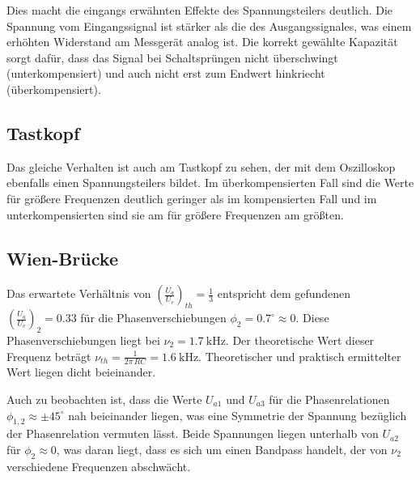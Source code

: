 \documentclass[10pt,a4paper]{scrartcl}
\begin{document}
Dies macht die eingangs erwähnten Effekte des Spannungsteilers deutlich.
Die Spannung vom Eingangssignal ist stärker als die des Ausgangssignales,
was einem erhöhten Widerstand am Messgerät analog ist.
Die korrekt gewählte Kapazität sorgt dafür,
dass das Signal bei Schaltsprüngen nicht überschwingt (unterkompensiert) und
auch nicht erst zum Endwert hinkriecht (überkompensiert).

\subsection {Tastkopf}

Das gleiche Verhalten ist auch am Tastkopf zu sehen,
der mit dem Oszilloskop ebenfalls einen Spannungsteilers bildet.
Im überkompensierten Fall sind die Werte für größere Frequenzen deutlich
geringer als im kompensierten Fall und im unterkompensierten sind sie am
für größere Frequenzen am größten.

\subsection {Wien-Brücke}

Das erwartete Verhältnis von $\left(\frac{U_a}{U_e}\right)_{th}=\frac{1}{3}$
entspricht dem gefundenen $\left(\frac{U_a}{U_e}\right)_2=0.33$ für die
Phasenverschiebungen $\phi_2=0.7^\circ\approx0$.
Diese Phasenverschiebungen liegt bei $\nu_2=1.7~\mathrm{kHz}$.
Der theoretische Wert dieser Frequenz beträgt
$\nu_{th}=\frac{1}{2\pi\,RC}=1.6~\mathrm{kHz}$.
Theoretischer und praktisch ermittelter Wert liegen dicht beieinander.

Auch zu beobachten ist, dass die Werte $U_{a1}$ und $U_{a3}$ für die
Phasenrelationen $\phi_{1,2}\approx\pm45^\circ$ nah beieinander liegen,
was eine Symmetrie der Spannung bezüglich der Phasenrelation vermuten lässt.
Beide Spannungen liegen unterhalb von $U_{a2}$ für $\phi_2\approx0$,
was daran liegt, dass es sich um einen Bandpass handelt,
der von $\nu_2$ verschiedene Frequenzen abschwächt.

\end{document}
